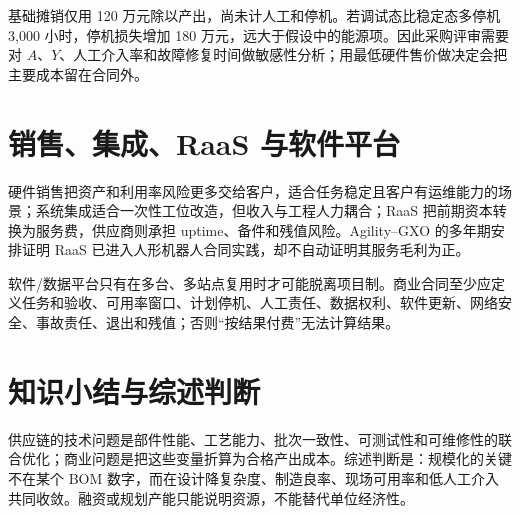 基础摊销仅用 120 万元除以产出，尚未计人工和停机。若调试态比稳定态多停机 3,000 小时，停机损失增加 180 万元，远大于假设中的能源项。因此采购评审需要对 $A$、$Y$、人工介入率和故障修复时间做敏感性分析；用最低硬件售价做决定会把主要成本留在合同外。

\section{销售、集成、RaaS 与软件平台}

硬件销售把资产和利用率风险更多交给客户，适合任务稳定且客户有运维能力的场景；系统集成适合一次性工位改造，但收入与工程人力耦合；RaaS 把前期资本转换为服务费，供应商则承担 uptime、备件和残值风险。Agility--GXO 的多年期安排证明 RaaS 已进入人形机器人合同实践\cite{agility2024gxo}，却不自动证明其服务毛利为正。

软件/数据平台只有在多台、多站点复用时才可能脱离项目制。商业合同至少应定义任务和验收、可用率窗口、计划停机、人工责任、数据权利、软件更新、网络安全、事故责任、退出和残值；否则“按结果付费”无法计算结果。

\section{知识小结与综述判断}

供应链的技术问题是部件性能、工艺能力、批次一致性、可测试性和可维修性的联合优化；商业问题是把这些变量折算为合格产出成本。综述判断是：规模化的关键不在某个 BOM 数字，而在设计降复杂度、制造良率、现场可用率和低人工介入共同收敛。融资或规划产能只能说明资源，不能替代单位经济性。

